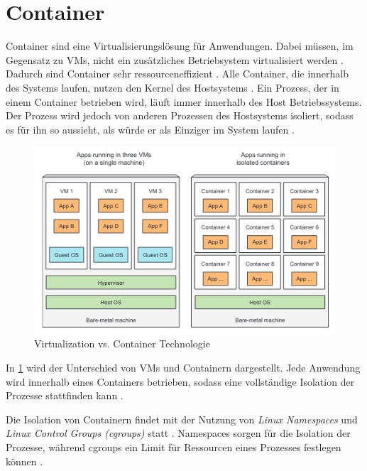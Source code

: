 \section{Container}
\label{sec:grundlagen:container}
Container sind eine Virtualisierungslösung für Anwendungen.
Dabei müssen, im Gegensatz zu \acfp{VM}, nicht ein zusätzliches Betriebsystem virtualisiert werden \cite{Marko2018}.
Dadurch sind Container sehr ressourceneffizient \cite{Kane2018}.
Alle Container, die innerhalb des Systems laufen, nutzen den Kernel des Hostsystems \cite{Marko2018}.
Ein Prozess, der in einem Container betrieben wird, läuft immer innerhalb des Host Betriebssystems.
Der Prozess wird jedoch von anderen Prozessen des Hostsystems isoliert, sodass es für ihn so aussieht, als würde er
als Einziger im System laufen \cite{Marko2018}.

\begin{figure}
  \includegraphics[width=\textwidth]{gfx/chapters/2_grundlagen/container-vs-vm.png}
  \caption{Virtualization vs. Container Technologie}
  \label{fig:container:vergleich}
\end{figure}

In \ref{fig:container:vergleich} wird der Unterschied von \acp{VM} und Containern dargestellt. 
Jede Anwendung wird innerhalb eines Containers betrieben, sodass eine vollständige Isolation der Prozesse
stattfinden kann \cite{Marko2018}.

Die Isolation von Containern findet mit der Nutzung von \emph{Linux Namespaces} und \emph{Linux Control Groups (cgroups)} statt \cite{Marko2018}.
Namespaces sorgen für die Isolation der Prozesse, 
während cgroups ein Limit für Ressourcen eines Prozesses festlegen können \cite{Marko2018}.

